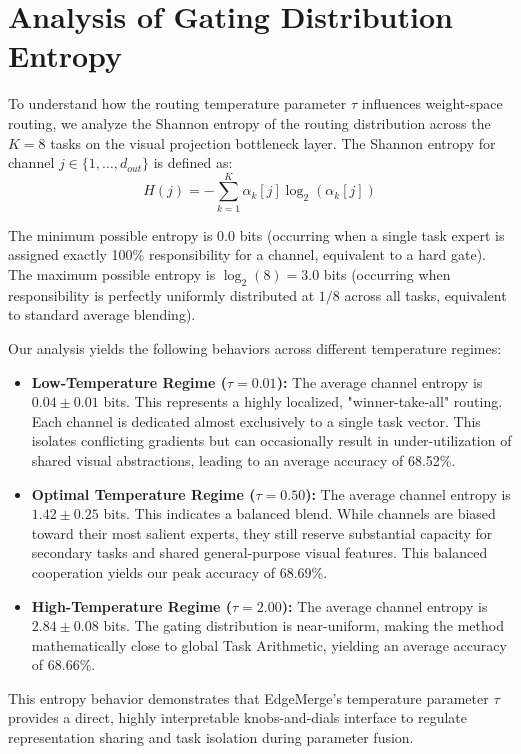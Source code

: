 \documentclass{article}
\theoremstyle{plain}
\theoremstyle{definition}
\theoremstyle{remark}
\begin{document}
\section{Analysis of Gating Distribution Entropy}
\label{app:entropy}

To understand how the routing temperature parameter $\tau$ influences weight-space routing, we analyze the Shannon entropy of the routing distribution across the $K=8$ tasks on the visual projection bottleneck layer. The Shannon entropy for channel $j \in \{1, \dots, d_{out}\}$ is defined as:
\begin{equation}
H(j) = -\sum_{k=1}^K \alpha_k[j] \log_2(\alpha_k[j])
\end{equation}

The minimum possible entropy is $0.0$ bits (occurring when a single task expert is assigned exactly 100\% responsibility for a channel, equivalent to a hard gate). The maximum possible entropy is $\log_2(8) = 3.0$ bits (occurring when responsibility is perfectly uniformly distributed at $1/8$ across all tasks, equivalent to standard average blending).

Our analysis yields the following behaviors across different temperature regimes:
\begin{itemize}
    \item \textbf{Low-Temperature Regime ($\tau = 0.01$):} The average channel entropy is $0.04 \pm 0.01$ bits. This represents a highly localized, "winner-take-all" routing. Each channel is dedicated almost exclusively to a single task vector. This isolates conflicting gradients but can occasionally result in under-utilization of shared visual abstractions, leading to an average accuracy of 68.52\%.
    \item \textbf{Optimal Temperature Regime ($\tau = 0.50$):} The average channel entropy is $1.42 \pm 0.25$ bits. This indicates a balanced blend. While channels are biased toward their most salient experts, they still reserve substantial capacity for secondary tasks and shared general-purpose visual features. This balanced cooperation yields our peak accuracy of 68.69\%.
    \item \textbf{High-Temperature Regime ($\tau = 2.00$):} The average channel entropy is $2.84 \pm 0.08$ bits. The gating distribution is near-uniform, making the method mathematically close to global Task Arithmetic, yielding an average accuracy of 68.66\%.
\end{itemize}

This entropy behavior demonstrates that EdgeMerge's temperature parameter $\tau$ provides a direct, highly interpretable knobs-and-dials interface to regulate representation sharing and task isolation during parameter fusion.
\end{document}
